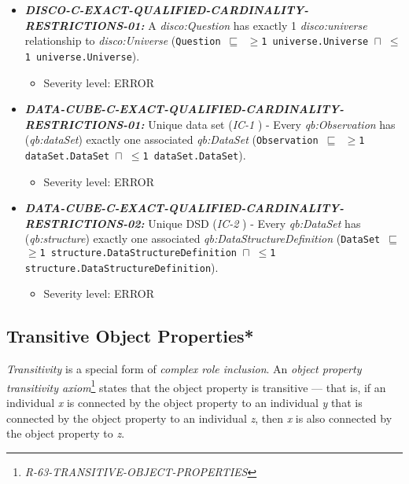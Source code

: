 \documentclass{llncs}
\newcommand{\ms}[1]{\texttt{#1}}
\begin{document}
\begin{itemize}
	\item \textbf{{\em DISCO-C-EXACT-QUALIFIED-CARDINALITY-RESTRICTIONS-01:}}
A {\em disco:Question} has exactly 1 {\em disco:universe} relationship to {\em disco:Universe} (\ms{Question $\sqsubseteq$ $\geq$1 universe.Universe $\sqcap$ $\leq$1 universe.Universe}).
  \begin{itemize}
		\item Severity level: ERROR
	\end{itemize}
\end{itemize}

\begin{itemize}
	\item \textbf{{\em DATA-CUBE-C-EXACT-QUALIFIED-CARDINALITY-RESTRICTIONS-01:}}
	Unique data set (\emph{IC-1} \cite{CyganiakReynolds2014}) -  
	Every \emph{qb:Observation} has (\emph{qb:dataSet}) exactly one associated \emph{qb:DataSet} (\ms{Observation $\sqsubseteq$ $\geq$1 dataSet.DataSet $\sqcap$ $\leq$1 dataSet.DataSet}). 
	\begin{itemize}
		\item Severity level: ERROR
	\end{itemize}
	\item \textbf{{\em DATA-CUBE-C-EXACT-QUALIFIED-CARDINALITY-RESTRICTIONS-02:}}
	Unique DSD (\emph{IC-2} \cite{CyganiakReynolds2014}) -  
	Every \emph{qb:DataSet} has (\emph{qb:structure}) exactly one associated \emph{qb:DataStructureDefinition} (\ms{DataSet $\sqsubseteq$ $\geq$1 structure.DataStructureDefinition $\sqcap$ $\leq$1 structure.DataStructureDefinition}). 
	\begin{itemize}
		\item Severity level: ERROR
	\end{itemize}
\end{itemize}

\subsection{Transitive Object Properties*}

\emph{Transitivity} is a special form of \emph{complex role inclusion}.
An \emph{object property transitivity axiom}\footnote{\emph{R-63-TRANSITIVE-OBJECT-PROPERTIES}} states that the object property is transitive — that is, if an individual \emph{x} is connected by the object property to an individual \emph{y} that is connected by the object property to an individual \emph{z}, then \emph{x} is also connected by the object property to \emph{z}.
\end{document}
